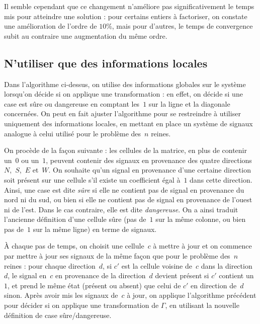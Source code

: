 \documentclass[11pt, openany, a4paper]{article}
\begin{document}
Il semble cependant que ce changement n'améliore pas significativement le temps mis pour atteindre une solution : pour certains entiers à factoriser, on constate une amélioration de l'ordre de $10\%$, mais pour d'autres, le temps de convergence subit au contraire une augmentation du même ordre.   


\subsection{N'utiliser que des informations locales}

Dans l'algorithme ci-dessus, on utilise des informations globales sur le système lorsqu'on décide si on applique une transformation : en effet, on décide si une case est sûre ou dangereuse en comptant les~$1$ sur la ligne et la diagonale concernées. On peut en fait ajuster l'algorithme pour se restreindre à utiliser uniquement des informations locales, en mettant en place un système de signaux analogue à celui utilisé pour le problème des~$n$ reines. 

On procède de la façon suivante : les cellules de la matrice, en plus de contenir un~$0$ ou un~$1$, peuvent contenir des signaux en provenance des quatre directions~$N$,~$S$,~$E$ et~$W$. On souhaite qu'un signal en provenance d'une certaine direction soit présent sur une cellule s'il existe un coefficient égal à~$1$ dans cette direction. Ainsi, une case est dite \emph{sûre} si elle ne contient pas de signal en provenance du nord ni du sud, ou bien si elle ne contient pas de signal en provenance de l'ouest ni de l'est. Dans le cas contraire, elle est dite \emph{dangereuse}. On a ainsi traduit l'ancienne définition d'une cellule sûre (pas de~$1$ sur la même colonne, ou bien pas de~$1$ sur la même ligne) en terme de signaux.

À chaque pas de temps, on choisit une cellule~$c$ à mettre à jour et on commence par mettre à jour ses signaux de la même façon que pour le problème des~$n$ reines : pour chaque direction~$d$, si $c'$ est la cellule voisine de~$c$ dans la direction~$d$, le signal en~$c$ en provenance de la direction~$d$ devient présent si $c'$ contient un~$1$, et prend le même état (présent ou absent) que celui de $c'$ en direction de~$d$ sinon.
Après avoir mis les signaux de~$c$ à jour, on applique l'algorithme précédent pour décider si on applique une transformation de $\Gamma$, en utilisant la nouvelle définition de case sûre/dangereuse. 
\end{document}
